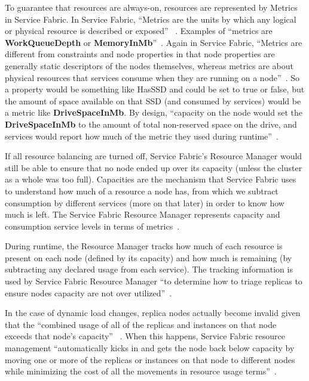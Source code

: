 To guarantee that resources are always-on, resources are represented
by Metrics in Service Fabric. In Service Fabric, ``Metrics are the units 
by which any
logical or physical resource is described or exposed''
~\cite{hid-sp18-501-fig2and3}. Examples of ``metrics are
{\bf WorkQueueDepth} or {\bf MemoryInMb}''~\cite{hid-sp18-501-description}. 
Again in Service Fabric, ``Metrics are different from
constraints and node properties in that node properties are generally
static descriptors of the nodes themselves, whereas metrics are about
physical resources that services consume when they are running on a
node''~\cite{hid-sp18-501-description}.  So a property would be something
like HasSSD and could be set to true or false, but the amount of space
available on that SSD (and consumed by services) would be a metric
like {\bf DriveSpaceInMb}. By design, ``capacity on the node would set the
{\bf DriveSpaceInMb} to the amount of total non-reserved space on the
drive, and services would report how much of the metric they used
during runtime''~\cite{hid-sp18-501-fig2and3}.

If all resource balancing are turned off, Service Fabric's Resource
Manager would still be able to ensure that no node ended up over its
capacity (unless the cluster as a whole was too full). Capacities are
the mechanism that Service Fabric uses to understand how much of a
resource a node has, from which we subtract consumption by different
services (more on that later) in order to know how much is left. The
Service Fabric Resource Manager represents capacity and consumption
service levels in terms of metrics~\cite{hid-sp18-501-description}.

During runtime, the Resource Manager tracks how much of each resource
is present on each node (defined by its capacity) and how much is
remaining (by subtracting any declared usage from each service).  The
tracking information is used by Service Fabric Resource Manager ``to
determine how to triage replicas to ensure nodes capacity are not over
utilized''~\cite{hid-sp18-501-description}.

In the case of dynamic load changes, replica nodes actually become invalid 
given that the ``combined usage of all of the replicas
and instances on that node exceeds that node's capacity''
~\cite{hid-sp18-501-description}. 
When this happens,
Service Fabric resource management ``automatically kicks in and gets the
node back below capacity by moving one or more of the replicas or
instances on that node to different nodes while minimizing the cost 
of all the movements in resource usage terms''~\cite{hid-sp18-501-description}.

